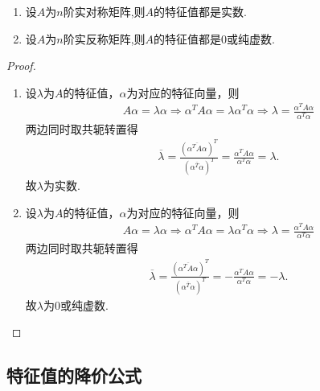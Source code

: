 \documentclass[../../main.tex]{subfiles}
\begin{document}
\begin{proposition}\label{proposition:实对称(反称)阵的特征值}
\begin{enumerate}
\item 设$A$为$n$阶实对称矩阵,则$A$的特征值都是实数.

\item 设$A$为$n$阶实反称矩阵,则$A$的特征值都是0或纯虚数.
\end{enumerate}
\end{proposition}
\begin{proof}
\begin{enumerate}
\item 设$\lambda$为$A$的特征值，$\alpha$为对应的特征向量，则
\begin{align*}
A\alpha = \lambda \alpha \Longrightarrow \alpha^T A\alpha = \lambda \alpha^T \alpha \Longrightarrow \lambda = \frac{\alpha^T A\alpha}{\alpha^T \alpha}
\end{align*}
两边同时取共轭转置得
\begin{align*}
\overline{\lambda} = \frac{\left( \overline{\alpha^T A\alpha} \right)^T}{\left( \overline{\alpha^T \alpha} \right)^T} = \frac{\alpha^T A\alpha}{\alpha^T \alpha} = \lambda.
\end{align*}
故$\lambda$为实数.

\item 设$\lambda$为$A$的特征值，$\alpha$为对应的特征向量，则
\begin{align*}
A\alpha = \lambda \alpha \Longrightarrow \alpha^T A\alpha = \lambda \alpha^T \alpha \Longrightarrow \lambda = \frac{\alpha^T A\alpha}{\alpha^T \alpha}
\end{align*}
两边同时取共轭转置得
\begin{align*}
\overline{\lambda} = \frac{\left( \overline{\alpha^T A\alpha} \right)^T}{\left( \overline{\alpha^T \alpha} \right)^T} = -\frac{\alpha^T A\alpha}{\alpha^T \alpha} = -\lambda.
\end{align*}
故$\lambda$为$0$或纯虚数.
\end{enumerate}
\end{proof}


\subsection{特征值的降价公式}
\end{document}
